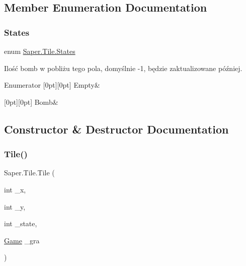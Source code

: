 \subsection{Member Enumeration Documentation}
\mbox{\label{class_saper_1_1_tile_a4318bc08fbfd24d56ffa8ea1359d845c}} 
\subsubsection{\texorpdfstring{States}{States}}
{\footnotesize\ttfamily enum \mbox{\hyperlink{class_saper_1_1_tile_a4318bc08fbfd24d56ffa8ea1359d845c}{Saper.\+Tile.\+States}}\hspace{0.3cm}{\ttfamily [strong]}}



Ilość bomb w pobliżu tego pola, domyślnie -\/1, będzie zaktualizowane później. 

\begin{DoxyEnumFields}{Enumerator}
[0pt][0pt]{}\mbox{\label{class_saper_1_1_tile_a4318bc08fbfd24d56ffa8ea1359d845cace2c8aed9c2fa0cfbed56cbda4d8bf07}} 
Empty&\\
\hline

[0pt][0pt]{}\mbox{\label{class_saper_1_1_tile_a4318bc08fbfd24d56ffa8ea1359d845cacd3abfc2f377a4c3fd9181f919d9de82}} 
Bomb&\\
\hline

\end{DoxyEnumFields}


\subsection{Constructor \& Destructor Documentation}
\mbox{\label{class_saper_1_1_tile_a5225a6086870b9c2c9cad42ae248be68}} 
\subsubsection{\texorpdfstring{Tile()}{Tile()}}
{\footnotesize\ttfamily Saper.\+Tile.\+Tile (\begin{DoxyParamCaption}\item[{int}]{\+\_\+x,  }\item[{int}]{\+\_\+y,  }\item[{int}]{\+\_\+state,  }\item[{\mbox{\hyperlink{class_saper_1_1_game}{Game}}}]{\+\_\+gra }\end{DoxyParamCaption})}



